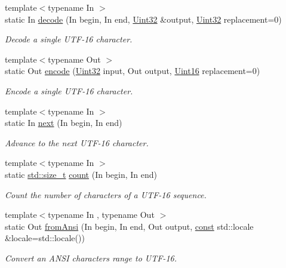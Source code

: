 \begin{DoxyCompactItemize}
{\footnotesize template$<$typename In $>$ }\\static In \hyperlink{classsf_1_1_utf_3_0116_01_4_a17be6fc08e51182e7ac8bf9269dfae37}{decode} (In begin, In end, \hyperlink{namespacesf_aa746fb1ddef4410bddf198ebb27e727c}{Uint32} \&output, \hyperlink{namespacesf_aa746fb1ddef4410bddf198ebb27e727c}{Uint32} replacement=0)
\begin{DoxyCompactList}\small\item\em Decode a single U\-T\-F-\/16 character. \end{DoxyCompactList}\item 
{\footnotesize template$<$typename Out $>$ }\\static Out \hyperlink{classsf_1_1_utf_3_0116_01_4_a516090c84ceec2cfde0a13b6148363bb}{encode} (\hyperlink{namespacesf_aa746fb1ddef4410bddf198ebb27e727c}{Uint32} input, Out output, \hyperlink{namespacesf_a2fcaf787248b0b83dfb6b145ca348246}{Uint16} replacement=0)
\begin{DoxyCompactList}\small\item\em Encode a single U\-T\-F-\/16 character. \end{DoxyCompactList}\item 
{\footnotesize template$<$typename In $>$ }\\static In \hyperlink{classsf_1_1_utf_3_0116_01_4_ab899108d77ce088eb001588e84d91525}{next} (In begin, In end)
\begin{DoxyCompactList}\small\item\em Advance to the next U\-T\-F-\/16 character. \end{DoxyCompactList}\item 
{\footnotesize template$<$typename In $>$ }\\static \hyperlink{nc__alloc_8h_a7b60c5629e55e8ec87a4547dd4abced4}{std\-::size\-\_\-t} \hyperlink{classsf_1_1_utf_3_0116_01_4_a6df8d9be8211ffe1095b3b82eac83f6f}{count} (In begin, In end)
\begin{DoxyCompactList}\small\item\em Count the number of characters of a U\-T\-F-\/16 sequence. \end{DoxyCompactList}\item 
{\footnotesize template$<$typename In , typename Out $>$ }\\static Out \hyperlink{classsf_1_1_utf_3_0116_01_4_a8a595dc1ea57ecf7aad944964913f0ff}{from\-Ansi} (In begin, In end, Out output, \hyperlink{term__entry_8h_a57bd63ce7f9a353488880e3de6692d5a}{const} std\-::locale \&locale=std\-::locale())
\begin{DoxyCompactList}\small\item\em Convert an A\-N\-S\-I characters range to U\-T\-F-\/16. \end{DoxyCompactList}\item 

\end{DoxyCompactItemize}

